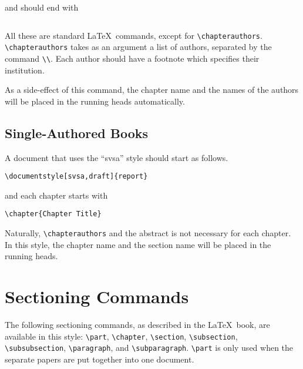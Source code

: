 and should end with
\begin{verbatim}

\end{verbatim}

All these are standard \LaTeX\ commands, except for \verb|\chapterauthors|.
\verb|\chapterauthors|
takes as an argument a list of authors, separated by the command \verb|\\|.
Each author should have a footnote which specifies their institution.

As a side-effect of this command,
the chapter name and the names of the authors will be placed in the
running heads automatically.

\subsection{Single-Authored Books}
A document that uses the ``svsa'' style should start as follows.
\begin{verbatim}
\documentstyle[svsa,draft]{report}

\end{verbatim}
and each chapter starts with
\begin{verbatim}
\chapter{Chapter Title}
\end{verbatim}
Naturally, \verb|\chapterauthors| and the abstract is not necessary
for each chapter.  In this style, the chapter name and the section name
will be placed in the running heads.

\section{Sectioning Commands}
The following sectioning commands, as described in the \LaTeX\ book,
are available in this style:
\verb|\part|, \verb|\chapter|,
\verb|\section|, \verb|\subsection|, \verb|\subsubsection|,
\verb|\paragraph|, and \verb|\subparagraph|.
\verb|\part| is only used when the separate papers are put together
into one document.


